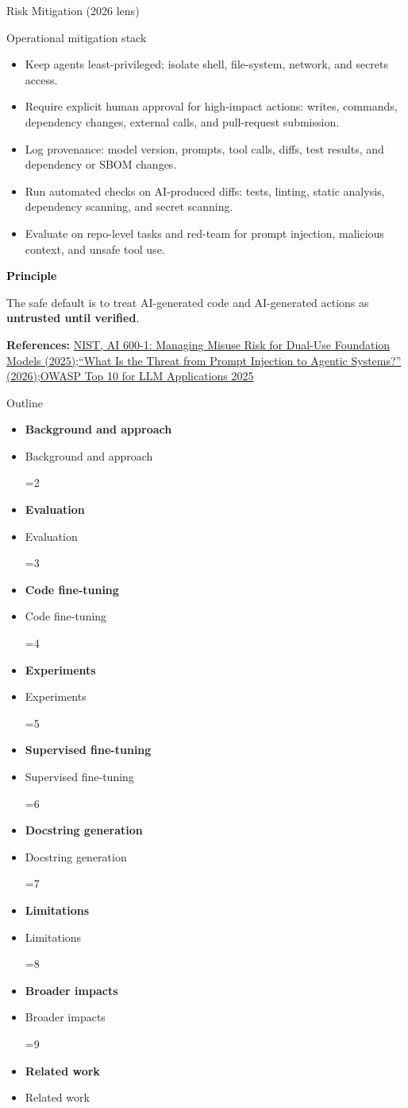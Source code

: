 \documentclass[aspectratio=43,9pt]{beamer}
\newcommand{\srclink}[2]{\href{#2}{\textcolor{black!68}{#1}}}
\newcommand{\sep}{;\hspace{0.35em}}
\newcommand{\refline}[2][References]{%
  \vfill
  {\raggedright\fontsize{5.1}{5.5}\selectfont\color{black!68}\textbf{#1:} #2\par}%
}
\newcommand{\srcNIST}{\srclink{NIST, AI 600-1: Managing Misuse Risk for Dual-Use Foundation Models (2025)}{https://nvlpubs.nist.gov/nistpubs/ai/NIST.AI.600-1.pdf}}
\newcommand{\srcPromptInj}{\srclink{``What Is the Threat from Prompt Injection to Agentic Systems?'' (2026)}{https://arxiv.org/html/2601.17548v1}}
\newcommand{\srcOWASP}{\srclink{OWASP Top 10 for LLM Applications 2025}{https://owasp.org/www-project-top-10-for-large-language-model-applications/assets/PDF/OWASP-Top-10-for-LLMs-v2025.pdf}}
\newcommand{\outlineitem}[2]{%
  \ifnum\currentstage=#1\relax
    \item[{\textcolor{black}{\large\textbullet}}] {\color{black}\bfseries #2}
  \else
    \item[{\textcolor{black}{\large\textbullet}}] {\color{black!70}#2}
  \fi
}
\newcommand{\outlineframe}[1]{%
\begin{frame}{Outline}
\small
\def\currentstage{#1}
\begin{itemize}
  \setlength{\itemsep}{0.45em}
  \outlineitem{1}{Background and approach}
  \outlineitem{2}{Evaluation}
  \outlineitem{3}{Code fine-tuning}
  \outlineitem{4}{Experiments}
  \outlineitem{5}{Supervised fine-tuning}
  \outlineitem{6}{Docstring generation}
  \outlineitem{7}{Limitations}
  \outlineitem{8}{Broader impacts}
  \outlineitem{9}{Related work}
\end{itemize}
\end{frame}
}
\begin{document}
\begin{frame}{Risk Mitigation (2026 lens)}
\scriptsize
\begin{block}{Operational mitigation stack}
\begin{itemize}
  \item Keep agents least-privileged; isolate shell, file-system, network, and secrets access.
  \item Require explicit human approval for high-impact actions: writes, commands, dependency changes, external calls, and pull-request submission.
  \item Log provenance: model version, prompts, tool calls, diffs, test results, and dependency or SBOM changes.
  \item Run automated checks on AI-produced diffs: tests, linting, static analysis, dependency scanning, and secret scanning.
  \item Evaluate on repo-level tasks and red-team for prompt injection, malicious context, and unsafe tool use.
\end{itemize}
\end{block}

{\large\textcolor{black}{\textbf{Principle}}\par}
\vspace{0.25em}
The safe default is to treat AI-generated code and AI-generated actions as \textbf{untrusted until verified}.

\refline{\srcNIST\sep \srcPromptInj\sep \srcOWASP}
\end{frame}

\outlineframe{9}
\end{document}
